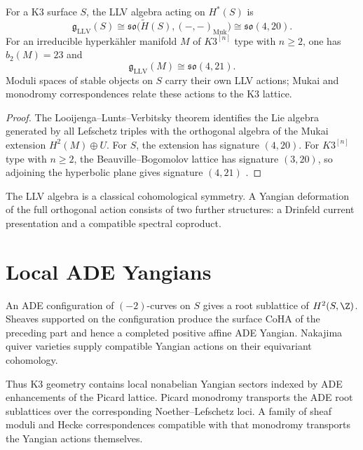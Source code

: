 \begin{theorem}
For a K3 surface $S$, the LLV algebra acting on $H^*(S)$ is
\[
 \mathfrak g_{\mathrm{LLV}}(S)
 \cong\mathfrak{so}\bigl(\widetilde H(S),(-,-)_{\mathrm{Muk}}\bigr)
 \cong\mathfrak{so}(4,20).
\]
For an irreducible hyperk\"ahler manifold $M$ of $K3^{[n]}$ type with $n\ge2$, one has $b_2(M)=23$ and
\[
 \mathfrak g_{\mathrm{LLV}}(M)\cong\mathfrak{so}(4,21).
\]
Moduli spaces of stable objects on $S$ carry their own LLV actions; Mukai and monodromy correspondences relate these actions to the K3 lattice.
\end{theorem}
\begin{proof}
The Looijenga--Lunts--Verbitsky theorem identifies the Lie algebra generated by all Lefschetz triples with the orthogonal algebra of the Mukai extension $H^2(M)\oplus U$. For $S$, the extension has signature $(4,20)$. For $K3^{[n]}$ type with $n\ge2$, the Beauville--Bogomolov lattice has signature $(3,20)$, so adjoining the hyperbolic plane gives signature $(4,21)$ \cite{LooijengaLunts,Verbitsky96}.
\end{proof}

The LLV algebra is a classical cohomological symmetry. A Yangian deformation of the full orthogonal action consists of two further structures: a Drinfeld current presentation and a compatible spectral coproduct.

\chapter{Local ADE Yangians}
An ADE configuration of $(-2)$-curves on $S$ gives a root sublattice of $H^2(S,\Z)$. Sheaves supported on the configuration produce the surface CoHA of the preceding part and hence a completed positive affine ADE Yangian. Nakajima quiver varieties supply compatible Yangian actions on their equivariant cohomology.

Thus K3 geometry contains local nonabelian Yangian sectors indexed by ADE enhancements of the Picard lattice. Picard monodromy transports the ADE root sublattices over the corresponding Noether--Lefschetz loci. A family of sheaf moduli and Hecke correspondences compatible with that monodromy transports the Yangian actions themselves.

